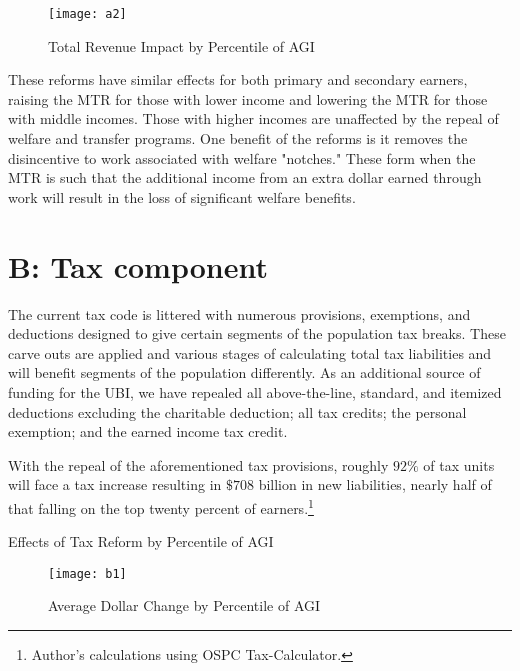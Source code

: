\documentclass{article}
\begin{document}
\begin{figure}[H]
\centering
\caption{Total Revenue Impact by Percentile of AGI}
\texttt{[image: a2]}
\end{figure}

These reforms have similar effects for both primary and secondary earners, raising the MTR for those with lower income and lowering the MTR for those with middle incomes. Those with higher incomes are unaffected by the repeal of welfare and transfer programs. One benefit of the reforms is it removes the disincentive to work associated with welfare "notches." These form when the MTR is such that the additional income from an extra dollar earned through work will result in the loss of significant welfare benefits.

\section{B: Tax component}
The current tax code is littered with numerous provisions, exemptions, and deductions designed to give certain segments of the population tax breaks. These carve outs are applied and various stages of calculating total tax liabilities and will benefit segments of the population differently. As an additional source of funding for the UBI, we have repealed all above-the-line, standard, and itemized deductions excluding the charitable deduction; all tax credits; the personal exemption; and the earned income tax credit.

With the repeal of the aforementioned tax provisions, roughly $92\%$ of tax units will face a tax increase resulting in $\$708$ billion in new liabilities, nearly half of that falling on the top twenty percent of earners.\footnote{Author’s calculations using OSPC Tax-Calculator.}

\begin{table}[H]
\caption{Effects of Tax Reform by Percentile of AGI}
\begin{center}
\begin{adjustbox}{max width=\textwidth}

\end{adjustbox}
\end{center}
\end{table}

\begin{figure}[H]
\centering
\caption{Average Dollar Change by Percentile of AGI}
\texttt{[image: b1]}
\end{figure}
\end{document}
